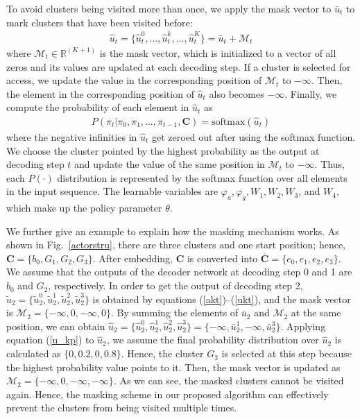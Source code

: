 \documentclass[journal]{IEEEtran}
\begin{document}
	To avoid clusters being visited more than once, we apply the mask vector to $\bar{u}_t$ to mark clusters that have been visited before:
	\begin{align}
	    \widehat{u}_t = \{\widehat{u}_t^0,\dots,\widehat{u}_t^k,\dots, \widehat{u}_t^K \} = \bar{u}_t + \mathcal{M}_t
	\end{align}
	where $\mathcal{M}_t \in \mathbb{R}^{(K+1)}$ is the mask vector, which is initialized to a vector of all zeros and its values are updated at each decoding step. If a cluster is selected for access, we update the value in the corresponding position of $ \mathcal{M}_t$ to $-\infty$.
	Then, the element in the corresponding position of $\widehat{u}_t$ also becomes $-\infty$.	
	Finally, we compute the probability of each element in $\widehat{u}_t$ as
	\begin{align}
	    	P(\pi_{t}|\pi_0,\pi_1,\dots,\pi_{t-1}, \bm{C}) = \text{softmax}\left(\widehat{u}_t\right) \label{u_kp}
	\end{align}
	where the negative infinities in $\widehat{u}_t$ get zeroed out after using the softmax function.  We choose the cluster pointed by the highest probability as the output at decoding step $t$ and update the value of the same position in $ \mathcal{M}_t$ to $-\infty$. Thus, each $P(\cdot)$ distribution is represented by the softmax function over all elements in the input sequence. The learnable variables are $\varphi_a, \varphi_g, W_1, W_2, W_3$, and $W_4$, which make up the policy parameter $\theta$.

    We further give an example to explain how the masking mechanism works. As shown in Fig.~\ref{actorstru}, there are three clusters and one start position; hence, $\bm{C} = \{b_0, G_1, G_2, G_3\}$. After embedding, $\bm{C}$ is converted into  $\overline{\bm{C}} = \{e_0, e_1, e_2, e_3\}$. We assume that the outputs of the decoder network at decoding step 0 and 1 are $b_0$ and $G_2$, respectively. In order to get the output of decoding step 2, $\widetilde{u}_2 = \{\widetilde{u}_2^0, \widetilde{u}_2^1, \widetilde{u}_2^2, \widetilde{u}_2^3 \}$ is obtained by equations (\ref{akt})--(\ref{ukt}), and the mask vector is $ \mathcal{M}_2 = \{-\infty,0,-\infty,0\}$.  By summing the elements of $\bar{u}_2$ and $ \mathcal{M}_2$ at the same position, we can obtain  $\widehat{u}_2 = \{ \widehat{u}_2^0, \widehat{u}_2^1, \widehat{u}_2^2, \widehat{u}_2^3 \} = \{-\infty, \bar{u}_2^1, -\infty, \bar{u}_2^3\}$. Applying equation (\ref{u_kp}) to $\widehat{u}_2$, we assume the final probability distribution over $\widehat{u}_2$ is calculated as $\{0, 0.2, 0,0.8\}$. Hence, the cluster $G_3$ is selected at this step because the highest probability value points to it. Then, the mask vector is updated as $ \mathcal{M}_2 = \{-\infty,0,-\infty,-\infty\}$. As we can see, the masked clusters cannot be visited again. Hence, the masking scheme in our proposed algorithm can effectively prevent the clusters from being visited multiple times.
	
\end{document}
